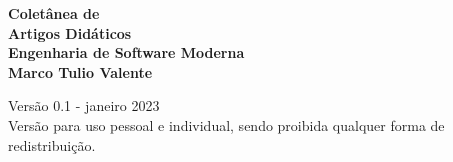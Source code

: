 \thispagestyle{empty}

\newpage
\thispagestyle{empty}
\vspace*{3cm}
\begin{center}
{\Huge \bf  Coletânea de}\\
\vspace*{0.8cm}
{\Huge \bf Artigos Didáticos}\\ 
\vspace*{1.4cm}
{\Large \bf Engenharia de Software Moderna}\\ 
\vspace*{3cm}
{\Large \bf Marco Tulio Valente}
\end{center}
\newpage

\thispagestyle{empty}
\vspace*{3cm}
\begin{center}
{\Large  Versão 0.1 - janeiro 2023}\\ 
\vspace*{1cm}
{Versão para  uso pessoal e individual, sendo proibida qualquer forma de redistribuição.}
\end{center}
\newpage

\tableofcontents
